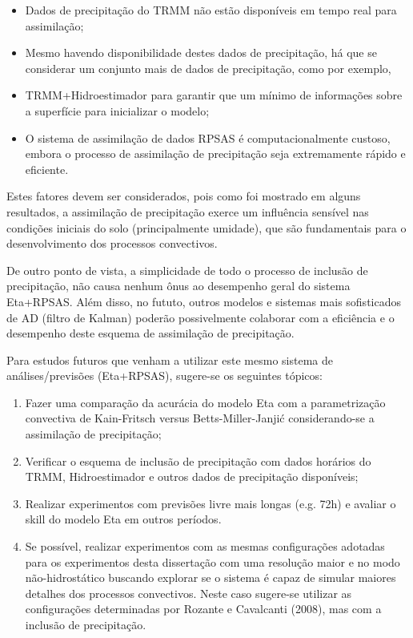 \begin{itemize}
\item Dados de precipitação do TRMM não estão disponíveis em tempo real para assimilação;
\item Mesmo havendo disponibilidade destes dados de precipitação, há que se considerar um conjunto mais de dados de precipitação, como por exemplo, \item TRMM+Hidroestimador para garantir que um mínimo de informações sobre a superfície para inicializar o modelo;
\item O sistema de assimilação de dados RPSAS é computacionalmente custoso, embora o processo de assimilação de precipitação seja extremamente rápido e eficiente.
\end{itemize}

Estes fatores devem ser considerados, pois como foi mostrado em alguns resultados, a assimilação de precipitação exerce um influência sensível nas condições iniciais do solo (principalmente umidade), que são fundamentais para o desenvolvimento dos processos convectivos.

De outro ponto de vista, a simplicidade de todo o processo de inclusão de precipitação, não causa nenhum ônus ao desempenho geral do sistema Eta+RPSAS. Além disso, no fututo, outros modelos e sistemas mais sofisticados de AD (filtro de Kalman) poderão possivelmente colaborar com a eficiência e o desempenho deste esquema de assimilação de precipitação.

Para estudos futuros que venham a utilizar este mesmo sistema de análises/previsões (Eta+RPSAS), sugere-se os seguintes tópicos:

\begin{enumerate}
\item Fazer uma comparação da acurácia do modelo Eta com a parametrização convectiva de Kain-Fritsch versus Betts-Miller-Janjić considerando-se a assimilação de precipitação;
\item Verificar o esquema de inclusão de precipitação com dados horários do TRMM, Hidroestimador e outros dados de precipitação disponíveis;
\item Realizar experimentos com previsões livre mais longas (e.g. 72h) e avaliar o skill do modelo Eta em outros períodos.
\item Se possível, realizar experimentos com as mesmas configurações adotadas para os experimentos desta dissertação com uma resolução maior e no modo não-hidrostático buscando explorar se o sistema é capaz de simular maiores detalhes dos processos convectivos. Neste caso sugere-se utilizar as configurações determinadas por Rozante e Cavalcanti (2008), mas com a inclusão de precipitação.
\end{enumerate}